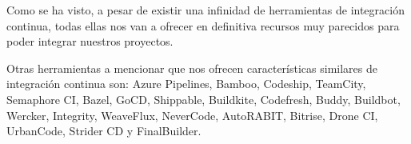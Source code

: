

Como se ha visto, a pesar de existir una infinidad de herramientas de integración continua, todas ellas nos van a ofrecer en definitiva recursos muy parecidos para poder integrar nuestros proyectos.

Otras herramientas a mencionar que nos ofrecen características similares de integración continua son: Azure Pipelines, Bamboo, Codeship, TeamCity, Semaphore CI, Bazel, GoCD, Shippable, Buildkite, Codefresh, Buddy, Buildbot, Wercker, Integrity, WeaveFlux, NeverCode, AutoRABIT, Bitrise, Drone CI, UrbanCode, Strider CD y FinalBuilder.
